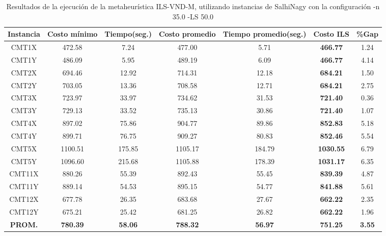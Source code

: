 \begin{table}[h]
\caption{Resultados de la ejecución de la metaheurística ILS-VND-M, utilizando instancias de SalhiNagy con la configuración -n 35.0 -LS 50.0}
\centering
\small
\begin{tabular}{c c c c c c c}
\hline\hline
Instancia & Costo mínimo & Tiempo(seg.) & Costo promedio & Tiempo promedio(seg.) & Costo ILS & \%Gap \\ [0.5ex]
\hline
CMT1X & 472.58 & 7.24 & 
477.00 & 5.71 & \bf{466.77} & 
1.24\\CMT1Y & 486.09 & 5.95 & 
489.19 & 6.09 & \bf{466.77} & 
4.14\\CMT2X & 694.46 & 12.92 & 
714.31 & 12.18 & \bf{684.21} & 
1.50\\CMT2Y & 703.05 & 13.36 & 
708.58 & 12.71 & \bf{684.21} & 
2.75\\CMT3X & 723.97 & 33.97 & 
734.62 & 31.53 & \bf{721.40} & 
0.36\\CMT3Y & 729.13 & 33.52 & 
735.13 & 30.86 & \bf{721.40} & 
1.07\\CMT4X & 897.02 & 75.86 & 
904.77 & 89.86 & \bf{852.83} & 
5.18\\CMT4Y & 899.71 & 76.75 & 
909.27 & 80.83 & \bf{852.46} & 
5.54\\CMT5X & 1100.51 & 175.85 & 
1105.17 & 184.79 & \bf{1030.55} & 
6.79\\CMT5Y & 1096.60 & 215.68 & 
1105.88 & 178.39 & \bf{1031.17} & 
6.35\\CMT11X & 880.26 & 55.39 & 
892.43 & 55.45 & \bf{839.39} & 
4.87\\CMT11Y & 889.14 & 54.53 & 
895.15 & 54.77 & \bf{841.88} & 
5.61\\CMT12X & 677.78 & 26.35 & 
683.68 & 27.67 & \bf{662.22} & 
2.35\\CMT12Y & 675.21 & 25.42 & 
681.25 & 26.82 & \bf{662.22} & 
1.96\\\bf{PROM.} & 
\bf{780.39} & \bf{58.06} & \bf{788.32} & \bf{56.97} & \bf{751.25} & \bf{3.55}\\[1ex]\hline
\end{tabular}
\label{table:ILS-VND-M-35-50-S}
\end{table}

